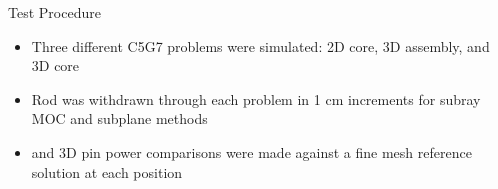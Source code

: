 
\begin{frame}[t]{Test Procedure}
    
    \begin{itemize}
        \item Three different C5G7 problems were simulated: 2D core, 3D assembly, and 3D core
        \item Rod was withdrawn through each problem in 1 cm increments for subray MOC and subplane methods
        \item \keff{} and 3D pin power comparisons were made against a fine mesh reference solution at each position
    \end{itemize}
    
\end{frame}


